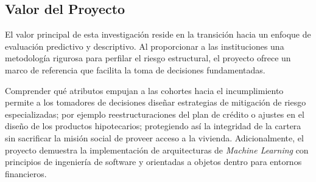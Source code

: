 \subsection{Valor del Proyecto}
El valor principal de esta investigación reside en la transición hacia un enfoque de evaluación predictivo y descriptivo. Al proporcionar a las instituciones una metodología rigurosa para perfilar el riesgo estructural, el proyecto ofrece un marco de referencia que facilita la toma de decisiones fundamentadas. 

Comprender qué atributos empujan a las cohortes hacia el incumplimiento permite a los tomadores de decisiones diseñar estrategias de mitigación de riesgo especializadas; por ejemplo reestructuraciones del plan de crédito o ajustes en el diseño de los productos hipotecarios; protegiendo así la integridad de la cartera sin sacrificar la misión social de proveer acceso a la vivienda. Adicionalmente, el proyecto demuestra la implementación de arquitecturas de \textit{Machine Learning} con principios de ingeniería de software y orientadas a objetos dentro para entornos financieros.